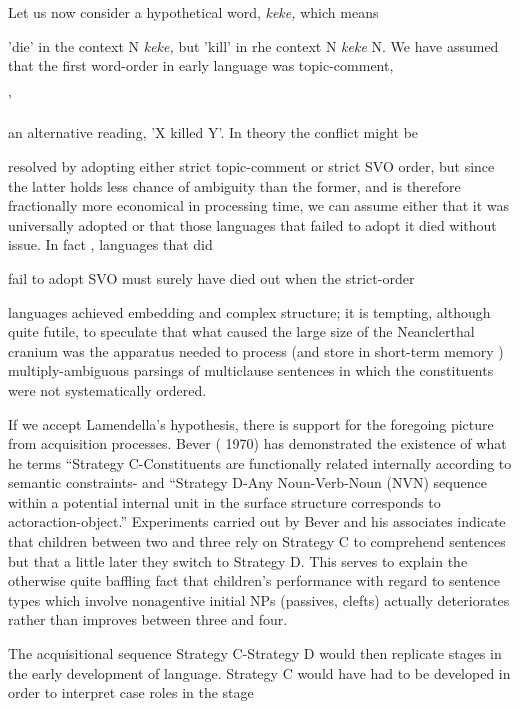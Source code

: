 Let us now consider a hypothetical word, \textit{keke,} which means

'die' in the context N \textit{keke,} but 'kill' in rhe context N \textit{keke} N. We have assumed that the first word-order in early language was topic-comment,

'

an alternative reading, 'X killed Y'. In theory the conflict might be

resolved by adopting either strict topic-comment or strict SVO order, but since the latter holds less chance of ambiguity than the former, and is therefore fractionally more economical in processing time, we can assume either that it was universally adopted or that those languages that failed to adopt it died without issue. In fact , languages that did

fail to adopt SVO must surely have died out when the strict-order

languages achieved embedding and complex structure; it is tempting, although quite futile, to speculate that what caused the large size of the Neanclerthal cranium was the apparatus needed to process (and store in short-term memory ) multiply-ambiguous parsings of multiclause sentences in which the constituents were not systematically ordered.

If we accept Lamendella's hypothesis, there is support for the foregoing picture from acquisition processes. Bever ( 1970) has demon\-strated the existence of what he terms ``Strategy C{\textquotedbl}{}-{\textquotedbl}Constituents are functionally related internally according to semantic constraints{\textquotedbl}- and ``Strategy D{\textquotedbl}{}-{\textquotedbl}Any Noun-Verb-Noun (NVN) sequence within a potential internal unit in the surface structure corresponds to actor\-action-object.'' Experiments carried out by Bever and his associates indicate that children between two and three rely on Strategy C to comprehend sentences but that a little later they switch to Strategy D. This serves to explain the otherwise quite baffling fact that children's performance with regard to sentence types which involve nonagentive initial NPs (passives, clefts) actually deteriorates rather than improves between three and four.

The acquisitional sequence Strategy C-Strategy D would then replicate stages in the early development of language. Strategy C would have had to be developed in order to interpret case roles in the stage



